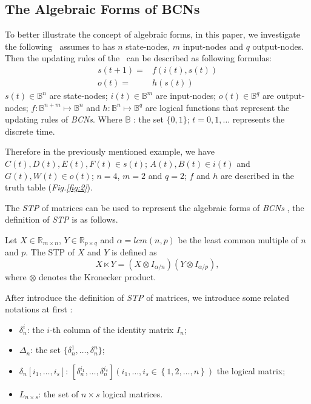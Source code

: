 \subsection{The Algebraic Forms of BCNs}
To better illustrate the concept of algebraic forms, in this paper, we investigate the following \BCN\ assumes to has $n$ state-nodes, $m$ input-nodes and $q$ output-nodes. Then the updating rules of the \BCN\ can be described as following formulas:
\begin{equation}
\begin{split}
s(t+1)=&f(i(t),s(t))\\
o(t)=&h(s(t))
\end{split}
\label{equ:1}
\end{equation}
$s(t)\in \mathbb{B}^n$ are state-nodes; $i(t)\in \mathbb{B}^m$ are input-nodes; $o(t)\in \mathbb{B}^q$ are output-nodes; $f:\mathbb{B}^{n+m}\mapsto \mathbb{B}^n$ and $h:\mathbb{B}^n\mapsto \mathbb{B}^q$ are logical functions that represent the updating rules of {\em BCNs}. Where $\mathbb{B}$ : the set $\{0,1\}$; $t=0,1,\ldots$ represents the discrete time. 

Therefore in the previously mentioned example, we have $C(t), D(t), E(t), F(t)\in s(t)$; $A(t), B(t)\in i(t)$ and $G(t), W(t)\in o(t)$; $n=4$, $m=2$ and $q=2$; $f$ and $h$ are described in the truth table ({\em Fig.\ref{fig:2}}). 

The {\em STP} of matrices can be used to represent the algebraic forms of {\em BCNs} \cite{cheng2009controllability}, the definition of {\em STP} is as follows.

\begin{definition}[STP] 
	\cite{Cheng2011Analysis} Let $X\in\mathbb{R}_{m\times n}$, $Y\in\mathbb{R}_{p\times q}$ and $\alpha=lcm(n,p)$ be the least common multiple of $n$ and $p$. The STP of $X$ and $Y$ is defined as \[X\ltimes Y=(X\otimes I_{\alpha/n})(Y\otimes I_{\alpha/p}),\] where $\otimes$ denotes the Kronecker product. 
\end{definition}

After introduce the definition of {\em STP} of matrices,  we introduce some related notations at first \cite{Zhang2016Observability}:
\begin{itemize}
  \item $\delta^i_n$: the $i$-th column of the identity matrix $I_n$;
  \item $\Delta_n$: the set $\{\delta^1_n,\ldots,\delta^n_n \}$; 
  \item $\delta_n \left[i_1,\ldots,i_s\right]$: $\left[\delta^{i_1}_n,\ldots,\delta^{i_s}_n\right]\left(i_1,\ldots,i_s\in\left\{1,2,\ldots,n\right\}\right)$ the logical matrix;
  \item  $L_{n\times s}$: the set of $n\times s$ logical matrices.
\end{itemize}


